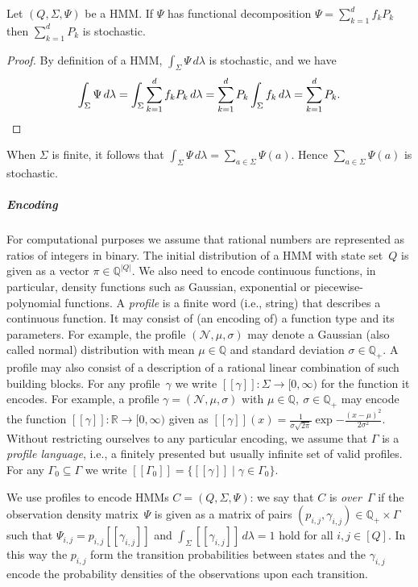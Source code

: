 \documentclass[a4paper,UKenglish,cleveref, autoref,mathscr]{lipics-v2019}
\newcommand{\RR}{\mathbb{R}}
\newcommand{\QQ}{\mathbb{Q}}
\newcommand{\1}{\mathbbm{1}}
\begin{document}
\begin{lemma}\label{stochasticPk}
Let $(Q, \Sigma, \Psi)$ be a HMM.
If $\Psi$ has functional decomposition $\Psi =  \sum_{k = 1}^d f_k P_k$ then $\sum_{k = 1}^d P_k$ is stochastic.
\end{lemma}
\begin{proof}
By definition of a HMM, $\int_{\Sigma} \Psi\, d\lambda$ is stochastic, and we have
\begin{equation*}
\int_{\Sigma} \Psi\, d\lambda = \int_{\Sigma} \sum_{k = 1}^d f_k P_k\, d\lambda =  \sum_{k = 1}^d P_k  \int_{\Sigma} f_k\, d\lambda =  \sum_{k = 1}^d P_k.\qedhere
\end{equation*}
\end{proof}
When $\Sigma$ is finite, it follows that $\int_\Sigma \Psi\, d\lambda = \sum_{a \in \Sigma} \Psi(a)$. Hence $\sum_{a \in \Sigma} \Psi(a)$ is stochastic.

\subparagraph*{Encoding}
For computational purposes we assume that rational numbers are represented as ratios of integers in binary.
The initial distribution of a HMM with state set~$Q$ is given as a vector $\pi \in \QQ^{|Q|}$.
We also need to encode continuous functions, in particular, density functions such as Gaussian, exponential or piecewise-polynomial functions.
A \emph{profile} is a finite word (i.e., string) that describes a continuous function.
It may consist of (an encoding of) a function type and its parameters. For example, the profile  $(\mathcal{N}, \mu, \sigma)$ may denote a Gaussian (also called normal) distribution with mean $\mu \in \QQ$ and standard deviation $\sigma \in \QQ_+$. A profile may also consist of a description of a rational linear combination of such building blocks.
For any profile~$\gamma$ we write $[\![\gamma]\!] : \Sigma \rightarrow [0,\infty)$ for the function it encodes.
For example, a profile $\gamma = (\mathcal{N}, \mu, \sigma)$ with $\mu \in \QQ,\ \sigma \in \QQ_+$ may encode the function $[\![\gamma]\!] : \RR \rightarrow [0,\infty)$ given as $[\![\gamma]\!](x) = \frac{1}{\sigma\sqrt{2\pi}} \exp{- \frac{(x - \mu)^2}{2\sigma^2}}$.
Without restricting ourselves to any particular encoding, we assume that $\Gamma$ is a \emph{profile language}, i.e., a finitely presented but usually infinite set of valid profiles. For any $\Gamma_0 \subseteq \Gamma$ we write $[\![\Gamma_0]\!] = \{[\![\gamma]\!] \mid \gamma \in \Gamma_0\}$.

We use profiles to encode HMMs $C = (Q, \Sigma, \Psi)$:
we say that $C$ is \emph{over}~$\Gamma$ if the observation density matrix~$\Psi$ is given as a matrix of pairs $(p_{i,j}, \gamma_{i,j}) \in \QQ_+  \times \Gamma$ such that $\Psi_{i,j} = p_{i,j} [\![\gamma_{i,j}]\!]$ and $\int_{\Sigma} [\![\gamma_{i,j}]\!]\,d\lambda = 1$ hold for all $i,j \in [Q]$. In this way the $p_{i,j}$ form the transition probabilities between states and the $\gamma_{i,j}$ encode the probability densities of the observations upon each transition.
\end{document}
